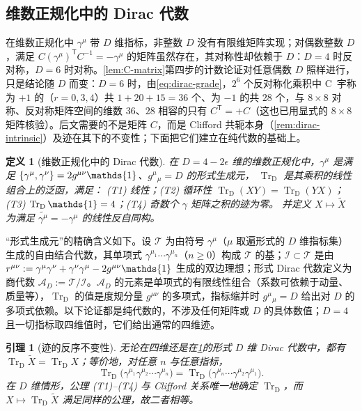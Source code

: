 \documentclass[UTF8,a4paper,11pt,fontset=fandol]{ctexart}
\let\amsmathbb\mathbb
\renewcommand{\mathbb}[1]{\ifx1#1\mathds{1}\else\amsmathbb{#1}\fi}
\theoremstyle{cplain}
\newtheorem{lemma}[theorem]{引理}
\theoremstyle{cdefinition}
\newtheorem{definition}[theorem]{定义}
\theoremstyle{cremark}
\numberwithin{equation}{section}
\newcommand{\TrD}{\operatorname{Tr}_{\mathrm{D}}}   %
\newcommand{\tp}{\mathsf{T}}                         %
\newcommand{\Cconj}[1]{\widetilde{#1}}              %
\begin{document}
\subsection{维数正规化中的 Dirac 代数}\label{sec:dirac-dimreg}

在维数正规化中 $\gamma^\mu$ 带 $D$ 维指标，非整数 $D$ 没有有限维矩阵实现；对偶数整数 $D$，满足 $C(\gamma^\mu)^{\tp}C^{-1}=-\gamma^\mu$ 的矩阵虽然存在，其对称性却依赖于 $D$：$D=4$ 时反对称，$D=6$ 时对称。\cref{lem:C-matrix}第四步的计数论证对任意偶数 $D$ 照样进行，只是结论随 $D$ 而变：$D=6$ 时，由\cref{eq:dirac-grade}，$2^6$ 个反对称化乘积中 C~宇称为 $+1$ 的（$r=0,3,4$）共 $1+20+15=36$ 个、为 $-1$ 的共 $28$ 个，与 $8\times8$ 对称、反对称矩阵空间的维数 $36$、$28$ 相容的只有 $C^{\tp}=+C$（这也已用显式的 $8\times8$ 矩阵核验）。后文需要的不是矩阵 $C$，而是 Clifford 共轭本身（\cref{rem:dirac-intrinsic}）及迹在其下的不变性；下面把它们建立在纯代数的基础上。

\begin{definition}[维数正规化中的 Dirac 代数]\label{def:dimreg-trace}
在 $D=4-2\epsilon$ 维的维数正规化中，$\gamma^\mu$ 是满足 $\{\gamma^\mu,\gamma^\nu\}=2g^{\mu\nu}\mathbb 1$、$g^{\mu}{}_{\mu}=D$ 的形式生成元，
$\TrD$ 是其乘积的线性组合上的泛函，满足：
(T1) 线性；(T2) 循环性 $\TrD(XY)=\TrD(YX)$；(T3) $\TrD\mathbb 1=4$；(T4) 奇数个 $\gamma$ 矩阵之积的迹为零。
并定义 $X\mapsto\Cconj X$ 为满足 $\Cconj{\gamma^\mu}=-\gamma^\mu$ 的线性反自同构。
\end{definition}

“形式生成元”的精确含义如下。设 $\mathcal T$ 为由符号 $\gamma^\mu$（$\mu$ 取遍形式的 $D$ 维指标集）生成的自由结合代数，其单项式 $\gamma^{\mu_1}\cdots\gamma^{\mu_n}$（$n\ge0$）构成 $\mathcal T$ 的基；$\mathcal I\subset\mathcal T$ 是由 $r^{\mu\nu}:=\gamma^\mu\gamma^\nu+\gamma^\nu\gamma^\mu-2g^{\mu\nu}\mathbb 1$ 生成的双边理想；形式 Dirac 代数定义为商代数 $\mathcal A_D:=\mathcal T/\mathcal I$。$\mathcal A_D$ 的元素是单项式的有限线性组合（系数可依赖于动量、质量等），$\TrD$ 的值是度规分量 $g^{\mu\nu}$ 的多项式，指标缩并时 $g^\mu{}_\mu=D$ 给出对 $D$ 的多项式依赖。以下论证都是纯代数的，不涉及任何矩阵或 $D$ 的具体数值；$D=4$ 且一切指标取四维值时，它们给出通常的四维迹。

\begin{lemma}[迹的反序不变性]\label{lem:trace-reversal}
无论在四维还是在\cref{def:dimreg-trace}的形式 $D$ 维 Dirac 代数中，都有 $\TrD\Cconj X=\TrD X$；等价地，对任意 $n$ 与任意指标，
\begin{equation}\label{eq:trace-reversal}
\TrD\bigl(\gamma^{\mu_1}\gamma^{\mu_2}\cdots\gamma^{\mu_n}\bigr)=\TrD\bigl(\gamma^{\mu_n}\cdots\gamma^{\mu_2}\gamma^{\mu_1}\bigr).
\end{equation}
在 $D$ 维情形，公理 (T1)--(T4) 与 Clifford 关系唯一地确定 $\TrD$，而 $X\mapsto\TrD\Cconj X$ 满足同样的公理，故二者相等。
\end{lemma}
\end{document}
